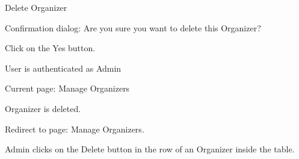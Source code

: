 
\begin{uc}{Delete Organizer}


    \begin{uc-mss}
    \item Confirmation dialog: Are you sure you want to delete this Organizer?
    \item Click on the Yes button.
    \end{uc-mss}

    \begin{uc-pre}
    \item User is authenticated as Admin
    \item Current page: Manage Organizers
    \end{uc-pre}

    \begin{uc-post}
    \item Organizer is deleted.
    \item Redirect to page: Manage Organizers.
    \end{uc-post}

    \begin{uc-trig}
        Admin clicks on the Delete button in the row of an Organizer inside the table.
    \end{uc-trig}
\end{uc}

